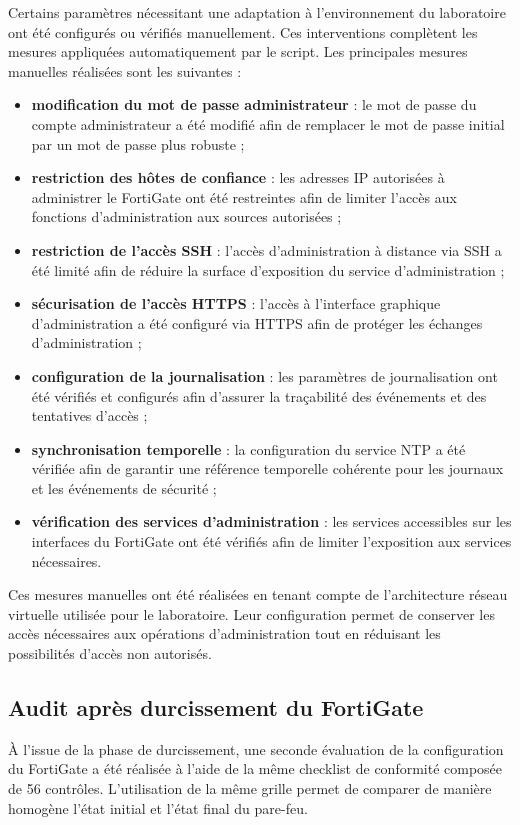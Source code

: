 Certains paramètres nécessitant une adaptation à l'environnement du laboratoire ont été configurés ou vérifiés manuellement. Ces interventions complètent les mesures appliquées automatiquement par le script. Les principales mesures manuelles réalisées sont les suivantes :
\begin{itemize}
  \item \textbf{modification du mot de passe administrateur} : le mot de passe du compte administrateur a été modifié afin de remplacer le mot de passe initial par un mot de passe plus robuste ;
  \item \textbf{restriction des hôtes de confiance} : les adresses IP autorisées à administrer le FortiGate ont été restreintes afin de limiter l'accès aux fonctions d'administration aux sources autorisées ;
  \item \textbf{restriction de l'accès SSH} : l'accès d'administration à distance via SSH a été limité afin de réduire la surface d'exposition du service d'administration ;
  \item \textbf{sécurisation de l'accès HTTPS} : l'accès à l'interface graphique d'administration a été configuré via HTTPS afin de protéger les échanges d'administration ;
  \item \textbf{configuration de la journalisation} : les paramètres de journalisation ont été vérifiés et configurés afin d'assurer la traçabilité des événements et des tentatives d'accès ;
  \item \textbf{synchronisation temporelle} : la configuration du service NTP a été vérifiée afin de garantir une référence temporelle cohérente pour les journaux et les événements de sécurité ;
  \item \textbf{vérification des services d'administration} : les services accessibles sur les interfaces du FortiGate ont été vérifiés afin de limiter l'exposition aux services nécessaires.
\end{itemize}
Ces mesures manuelles ont été réalisées en tenant compte de l'architecture réseau virtuelle utilisée pour le laboratoire. Leur configuration permet de conserver les accès nécessaires aux opérations d'administration tout en réduisant les possibilités d'accès non autorisés.

\subsection{Audit après durcissement du FortiGate}

À l'issue de la phase de durcissement, une seconde évaluation de la configuration du FortiGate a été réalisée à l'aide de la même checklist de conformité composée de 56 contrôles. L'utilisation de la même grille permet de comparer de manière homogène l'état initial et l'état final du pare-feu.

